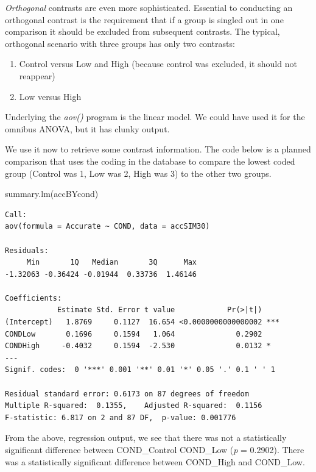 \documentclass[
  english,
]{book}
\newenvironment{Shaded}{\begin{snugshade}}{\end{snugshade}}
\newcommand{\FunctionTok}[1]{\textcolor[rgb]{0.00,0.00,0.00}{#1}}
\newcommand{\NormalTok}[1]{#1}
\providecommand{\tightlist}{%
  \setlength{\itemsep}{0pt}\setlength{\parskip}{0pt}}
\begin{document}
\emph{Orthogonal} contrasts are even more sophisticated. Essential to conducting an orthogonal contrast is the requirement that if a group is singled out in one comparison it should be excluded from subsequent contrasts. The typical, orthogonal scenario with three groups has only two contrasts:

\begin{enumerate}
\def\labelenumi{\arabic{enumi}.}
\tightlist
\item
  Control versus Low and High (because control was excluded, it should not reappear)
\item
  Low versus High
\end{enumerate}

Underlying the \emph{aov()} program is the linear model. We could have used it for the omnibus ANOVA, but it has clunky output.

We use it now to retrieve some contrast information. The code below is a planned comparison that uses the coding in the database to compare the lowest coded group (Control was 1, Low was 2, High was 3) to the other two groups.

\begin{Shaded}
\begin{Highlighting}[]
\FunctionTok{summary.lm}\NormalTok{(accBYcond)}
\end{Highlighting}
\end{Shaded}

\begin{verbatim}
Call:
aov(formula = Accurate ~ COND, data = accSIM30)

Residuals:
     Min       1Q   Median       3Q      Max 
-1.32063 -0.36424 -0.01944  0.33736  1.46146 

Coefficients:
            Estimate Std. Error t value            Pr(>|t|)    
(Intercept)   1.8769     0.1127  16.654 <0.0000000000000002 ***
CONDLow       0.1696     0.1594   1.064              0.2902    
CONDHigh     -0.4032     0.1594  -2.530              0.0132 *  
---
Signif. codes:  0 '***' 0.001 '**' 0.01 '*' 0.05 '.' 0.1 ' ' 1

Residual standard error: 0.6173 on 87 degrees of freedom
Multiple R-squared:  0.1355,    Adjusted R-squared:  0.1156 
F-statistic: 6.817 on 2 and 87 DF,  p-value: 0.001776
\end{verbatim}

From the above, regression output, we see that there was not a statistically significant difference between COND\_Control COND\_Low (\emph{p} = 0.2902). There was a statistically significant difference between COND\_High and COND\_Low.
\end{document}
